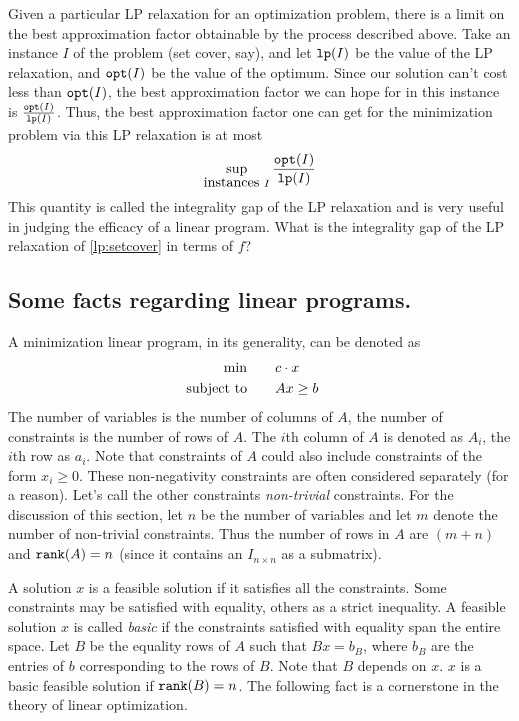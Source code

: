 \documentclass[11pt]{article}
\def\opt{{\tt opt}}
\def\lp{{\tt lp}}
\def\rank{{\tt rank}}
\begin{document}
Given a particular LP relaxation for an optimization problem, there is a limit on the
best approximation factor obtainable by the process described above. 
Take an instance $I$ of the problem (set cover, say), and let $\lp(I)$ be the value of the 
LP relaxation, and $\opt(I)$ be the value of the optimum. Since our solution can't cost less than 
$\opt(I)$, the best approximation factor we can hope for in this instance is $\frac{\opt(I)}{\lp(I)}$.
Thus, the best approximation factor one can get for the minimization problem via this LP relaxation is at most
$$\sup_{\mbox{instances}~I} \frac{\opt(I)}{\lp(I)}$$
This quantity is called the integrality gap of the LP relaxation and is very useful in judging the efficacy of a
linear program.  What is the integrality gap of the LP relaxation of \eqref{lp:setcover} in terms of $f$?


\subsection{Some facts regarding linear programs.}

\noindent
A minimization linear program, in its generality, 
can be denoted as 
\begin{align}
\min & \qquad c \cdot x & \label{eq:primal} \\
\mbox{subject to} &\qquad Ax \ge b & \notag 
\end{align}
\noindent
The number of variables is the number of columns of $A$, the number of constraints is the number of rows of $A$. The $i$th column of $A$ is denoted as $A_i$, the $i$th row as $a_i$.
Note that constraints of $A$ could also include constraints of the form $x_i \ge 0$. These non-negativity constraints are often considered separately (for a reason). Let's call the other constraints {\em non-trivial} constraints. For the discussion of this section, let $n$ be the number of variables and let $m$ denote the number of non-trivial constraints. Thus the number of rows in $A$ are $(m+n)$ and $\rank(A) = n$ (since it contains an $I_{n\times n}$ as a submatrix).

A solution $x$ is a feasible solution if it satisfies all the constraints. 
Some constraints may be satisfied with equality, others as a strict inequality. 
A feasible solution $x$ is called {\em basic} if the constraints satisfied with equality span the entire space. Let $B$ be the equality rows of $A$ such that $Bx=b_B$, where $b_B$ are the entries of $b$ corresponding to the rows of $B$. Note that $B$ depends on $x$. $x$ is a basic feasible solution if $\rank(B) = n$.
The following fact is a cornerstone in the theory of linear optimization.
\end{document}
